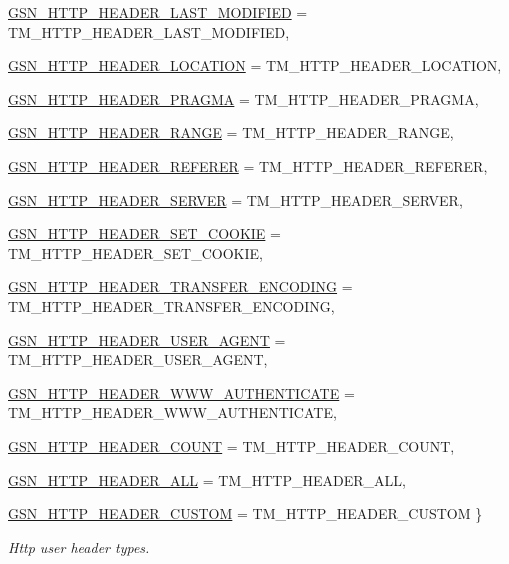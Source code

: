 \begin{DoxyCompactItemize}
\par
\hyperlink{a00665_gga46b2de5d0afbd35d93a0426f601866d9ad5ceed23d52b9e9019edc16f8707e6b0}{GSN\_\-HTTP\_\-HEADER\_\-LAST\_\-MODIFIED} =  TM\_\-HTTP\_\-HEADER\_\-LAST\_\-MODIFIED, 
\par
\hyperlink{a00665_gga46b2de5d0afbd35d93a0426f601866d9ab3d733364eb5c459ce08ebc2699db553}{GSN\_\-HTTP\_\-HEADER\_\-LOCATION} =  TM\_\-HTTP\_\-HEADER\_\-LOCATION, 
\par
\hyperlink{a00665_gga46b2de5d0afbd35d93a0426f601866d9a6d00784bfa262bc4b8f39d7429797ebf}{GSN\_\-HTTP\_\-HEADER\_\-PRAGMA} =  TM\_\-HTTP\_\-HEADER\_\-PRAGMA, 
\par
\hyperlink{a00665_gga46b2de5d0afbd35d93a0426f601866d9adad6f1341e717b66b4ead62db3ceb05e}{GSN\_\-HTTP\_\-HEADER\_\-RANGE} =  TM\_\-HTTP\_\-HEADER\_\-RANGE, 
\par
\hyperlink{a00665_gga46b2de5d0afbd35d93a0426f601866d9adf7b5ae4cef8e8227033722bb22d5b3d}{GSN\_\-HTTP\_\-HEADER\_\-REFERER} =  TM\_\-HTTP\_\-HEADER\_\-REFERER, 
\par
\hyperlink{a00665_gga46b2de5d0afbd35d93a0426f601866d9a9ffaa43740888a39e84f5b1d2e15d51a}{GSN\_\-HTTP\_\-HEADER\_\-SERVER} =  TM\_\-HTTP\_\-HEADER\_\-SERVER, 
\par
\hyperlink{a00665_gga46b2de5d0afbd35d93a0426f601866d9a12f9de4127ca315ca5f5114ffd7630b5}{GSN\_\-HTTP\_\-HEADER\_\-SET\_\-COOKIE} =  TM\_\-HTTP\_\-HEADER\_\-SET\_\-COOKIE, 
\par
\hyperlink{a00665_gga46b2de5d0afbd35d93a0426f601866d9a90bff9b550346f429f9e82a474a2d62f}{GSN\_\-HTTP\_\-HEADER\_\-TRANSFER\_\-ENCODING} =  TM\_\-HTTP\_\-HEADER\_\-TRANSFER\_\-ENCODING, 
\par
\hyperlink{a00665_gga46b2de5d0afbd35d93a0426f601866d9a5875dadf3bebd9cd712b7c5368d26604}{GSN\_\-HTTP\_\-HEADER\_\-USER\_\-AGENT} =  TM\_\-HTTP\_\-HEADER\_\-USER\_\-AGENT, 
\par
\hyperlink{a00665_gga46b2de5d0afbd35d93a0426f601866d9a4b5354945516b484ca5c496f76aa2c78}{GSN\_\-HTTP\_\-HEADER\_\-WWW\_\-AUTHENTICATE} =  TM\_\-HTTP\_\-HEADER\_\-WWW\_\-AUTHENTICATE, 
\par
\hyperlink{a00665_gga46b2de5d0afbd35d93a0426f601866d9a8ff33526c071a88b7a22876c9fb5d7f6}{GSN\_\-HTTP\_\-HEADER\_\-COUNT} =  TM\_\-HTTP\_\-HEADER\_\-COUNT, 
\par
\hyperlink{a00665_gga46b2de5d0afbd35d93a0426f601866d9a8ce106e14e33a8cab07986f230295322}{GSN\_\-HTTP\_\-HEADER\_\-ALL} =  TM\_\-HTTP\_\-HEADER\_\-ALL, 
\par
\hyperlink{a00665_gga46b2de5d0afbd35d93a0426f601866d9aba6837662f218a5fe683e9a30ff58a91}{GSN\_\-HTTP\_\-HEADER\_\-CUSTOM} =  TM\_\-HTTP\_\-HEADER\_\-CUSTOM
 \}
\begin{DoxyCompactList}\small\item\em Http user header types. \end{DoxyCompactList}\end{DoxyCompactItemize}
